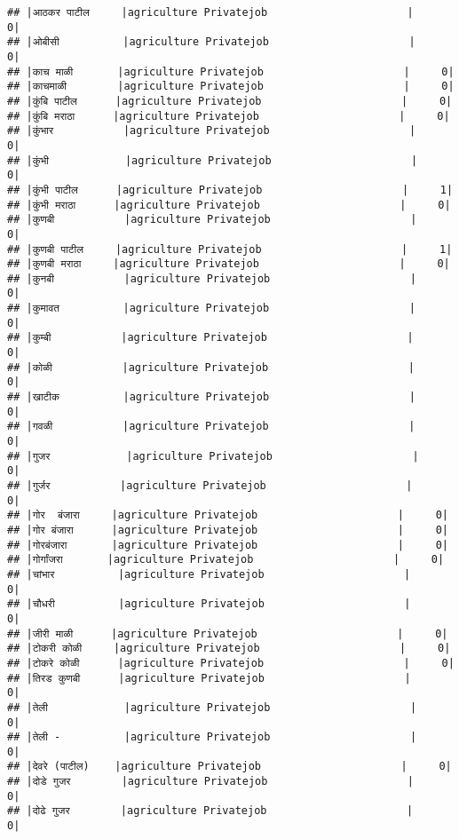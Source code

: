 \documentclass[
]{article}
\begin{document}
\begin{verbatim}
## |आठकर पाटील     |agriculture Privatejob                      |     0|
## |ओबीसी          |agriculture Privatejob                      |     0|
## |काच माळी       |agriculture Privatejob                      |     0|
## |काचमाळी        |agriculture Privatejob                      |     0|
## |कुंबि पाटील      |agriculture Privatejob                      |     0|
## |कुंबि मराठा      |agriculture Privatejob                      |     0|
## |कुंभार           |agriculture Privatejob                      |     0|
## |कुंभी            |agriculture Privatejob                      |     0|
## |कुंभी पाटील      |agriculture Privatejob                      |     1|
## |कुंभी मराठा      |agriculture Privatejob                      |     0|
## |कुणबी           |agriculture Privatejob                      |     0|
## |कुणबी पाटील     |agriculture Privatejob                      |     1|
## |कुणबी मराठा     |agriculture Privatejob                      |     0|
## |कुनबी           |agriculture Privatejob                      |     0|
## |कुमावत          |agriculture Privatejob                      |     0|
## |कुम्बी           |agriculture Privatejob                      |     0|
## |कोळी           |agriculture Privatejob                      |     0|
## |खाटीक          |agriculture Privatejob                      |     0|
## |गवळी           |agriculture Privatejob                      |     0|
## |गुजर            |agriculture Privatejob                      |     0|
## |गुर्जर           |agriculture Privatejob                      |     0|
## |गोर  बंजारा     |agriculture Privatejob                      |     0|
## |गोर बंजारा      |agriculture Privatejob                      |     0|
## |गोरबंजारा       |agriculture Privatejob                      |     0|
## |गोर्गांजरा       |agriculture Privatejob                      |     0|
## |चांभार          |agriculture Privatejob                      |     0|
## |चौधरी          |agriculture Privatejob                      |     0|
## |जीरी माळी      |agriculture Privatejob                      |     0|
## |टोकरी कोळी     |agriculture Privatejob                      |     0|
## |टोकरे कोळी      |agriculture Privatejob                      |     0|
## |तिरड कुणबी      |agriculture Privatejob                      |     0|
## |तेली            |agriculture Privatejob                      |     0|
## |तेली -          |agriculture Privatejob                      |     0|
## |देवरे (पाटील)    |agriculture Privatejob                      |     0|
## |दोडे गुजर        |agriculture Privatejob                      |     0|
## |दोढे गुजर        |agriculture Privatejob                      |     0|

\end{verbatim}
\end{document}
